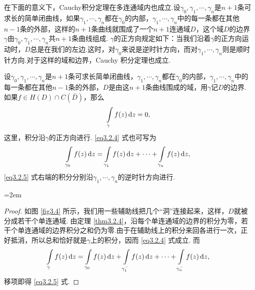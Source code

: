 在下面的意义下，Cauchy积分定理在多连通域内也成立.设$\gamma_0,\gamma_1,\cdots,\gamma_n$是$n+1$条可求长的简单闭曲线，如果$\gamma_1,\cdots,\gamma_n$都在$\gamma_0$的内部，$\gamma_1,\cdots,\gamma_n$中的每一条都在其他$n-1$条的外部，这样的$n+1$条曲线就围成了一个$n+1$连通域$D$，这个域$D$的边界$\gamma$由$\gamma_0,\gamma_1,\cdots,\gamma_n$共$n+1$条曲线组成. $\gamma$的正方向规定如下：当我们沿着$\gamma$的正方向运动时，$D$总是在我们的左边.这时，对$\gamma_0$来说是逆时针方向，而对$\gamma_1,\cdots,\gamma_n$则是顺时针方向.对于这样的域和边界，Cauchy 积分定理也成立.
\begin{theorem}\label{thm3.2.5}
  设$\gamma_0,\gamma_1,\cdots,\gamma_n$是$n+1$条可求长简单闭曲线，$\gamma_1,\cdots,\gamma_n$都在$\gamma_0$的内部，$\gamma_1,\cdots,\gamma_n$中的每一条都在其他$n-1$条的外部，$D$是由这$n+1$条曲线围成的域，用$\gamma$记$D$的边界.如果$f\in H(D)\cap C(\bar D)$，那么
  \begin{equation}\label{eq3.2.4}
    \int\limits_\gamma f(z)\mathop{}\!\mathrm dz = 0,
  \end{equation}
  这里，积分沿$\gamma$的正方向进行. \eqref{eq3.2.4} 式也可写为
  \begin{equation}\label{eq3.2.5}
    \int\limits_{\gamma_0}f(z)\mathop{}\!\mathrm dz=\int\limits_{\gamma_1}f(z)\mathop{}\!\mathrm dz +
    \cdots+\int\limits_{\gamma_n}f(z)\mathop{}\!\mathrm dz,
  \end{equation}
  \eqref{eq3.2.5} 式右端的积分分别沿$\gamma_1,\cdots,\gamma_n$的逆时针方向进行.
\end{theorem}
\noindent\begin{minipage}{0.65\textwidth}
  \parindent=2em
\begin{proof}
  如图 \ref{fig3.4} 所示，我们用一些辅助线把几个``洞''连接起来，这样，$D$就被分成若干个单连通域. 由定理 \ref{thm3.2.4}，沿每个单连通域的边界的积分为零，若干个单连通域的边界积分之和仍为零.由于在辅助线上的积分来回各进行一次，正好抵消，所以总和恰好就是$\gamma$上的积分，因而 \eqref{eq3.2.4} 式成立. 而
  \begin{equation*}
    \int\limits_{\gamma}f(z)\mathop{}\!\mathrm dz = \int\limits_{\gamma_0}f(z)\mathop{}\!\mathrm dz + \int\limits_{\gamma_1^-}f(z)\mathop{}\!\mathrm dz +
    \cdots + \int\limits_{\gamma_n^-}f(z)\mathop{}\!\mathrm dz,
  \end{equation*}
  移项即得 \eqref{eq3.2.5} 式.
\end{proof}
\end{minipage}
